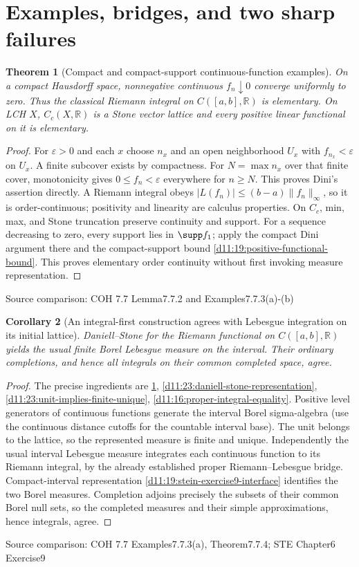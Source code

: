\documentclass[11pt,oneside,openany]{book}
\newtheorem{theorem}{Theorem}[chapter]
\newtheorem{corollary}[theorem]{Corollary}
\theoremstyle{definition}
\theoremstyle{remark}
\newcommand{\R}{\mathbb R}\newcommand{\C}{\mathbb C}
\newcommand{\eps}{\varepsilon}\newcommand{\ee}{\varepsilon}
\newcommand{\family}[1]{}
\newcommand{\source}[1]{\par\begingroup\small\sffamily\color{black!65}Source comparison: #1\par\endgroup}
\begin{document}
\section{Examples, bridges, and two sharp failures}

\begin{theorem}[Compact and compact-support continuous-function examples]\family{D11.23.dini_elementary_examples}\label{d11:23:dini-elementary-examples}
On a compact Hausdorff space, nonnegative continuous $f_n\downarrow0$ converge uniformly to zero. Thus the classical Riemann integral on $C([a,b],\R)$ is elementary. On LCH $X$, $C_c(X,\R)$ is a Stone vector lattice and every positive linear functional on it is elementary.
\end{theorem}
\begin{proof}
For $\eps>0$ and each $x$ choose $n_x$ and an open neighborhood $U_x$ with $f_{n_x}<\eps$ on $U_x$. A finite subcover exists by compactness. For $N=\max n_x$ over that finite cover, monotonicity gives $0\le f_n<\eps$ everywhere for $n\ge N$. This proves Dini's assertion directly. A Riemann integral obeys $|L(f_n)|\le(b-a)\|f_n\|_\infty$, so it is order-continuous; positivity and linearity are calculus properties. On $C_c$, min, max, and Stone truncation preserve continuity and support. For a sequence decreasing to zero, every support lies in $\supp f_1$; apply the compact Dini argument there and the compact-support bound \cref{d11:19:positive-functional-bound}. This proves elementary order continuity without first invoking measure representation.
\end{proof}
\source{COH 7.7 Lemma7.7.2 and Examples7.7.3(a)-(b)}

\begin{corollary}[An integral-first construction agrees with Lebesgue integration on its initial lattice]\family{D11.23.riemann_lebesgue_bridge}\label{d11:23:riemann-lebesgue-bridge}
Daniell--Stone for the Riemann functional on $C([a,b],\R)$ yields the usual finite Borel Lebesgue measure on the interval. Their ordinary completions, and hence all integrals on their common completed space, agree.
\end{corollary}
\begin{proof}
The precise ingredients are \cref{d11:23:dini-elementary-examples}, \cref{d11:23:daniell-stone-representation}, \cref{d11:23:unit-implies-finite-unique}, \cref{d11:16:proper-integral-equality}. Positive level generators of continuous functions generate the interval Borel sigma-algebra (use the continuous distance cutoffs for the countable interval base). The unit belongs to the lattice, so the represented measure is finite and unique. Independently the usual interval Lebesgue measure integrates each continuous function to its Riemann integral, by the already established proper Riemann--Lebesgue bridge. Compact-interval representation \cref{d11:19:stein-exercise9-interface} identifies the two Borel measures. Completion adjoins precisely the subsets of their common Borel null sets, so the completed measures and their simple approximations, hence integrals, agree.
\end{proof}
\source{COH 7.7 Examples7.7.3(a), Theorem7.7.4; STE Chapter6 Exercise9}
\end{document}
